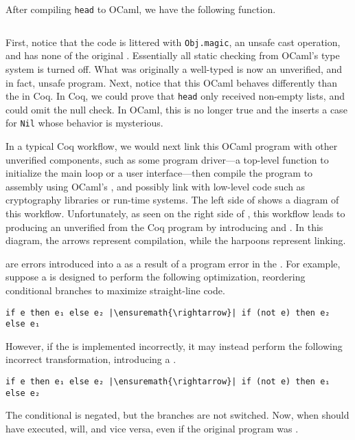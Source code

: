 After compiling \texttt{head} to OCaml, we have the following function.
\inputminted[xleftmargin=1em,firstline=16,lastline=23,firstnumber=1]{ocaml}{chapters/intro/head.ml}

\noindent First, notice that the code is littered with
\texttt{Obj.magic}, an unsafe cast operation, and has none of the
original .
Essentially all static checking from OCaml's type system is turned off.
What was originally a well-typed  is now an unverified,
and in fact, unsafe program.
Next, notice that this OCaml  behaves differently than the
 in Coq.
In Coq, we could prove that \texttt{head} only received non-empty
lists, and could omit the null check.
In OCaml, this is no longer true and the  inserts a case for
\texttt{Nil} whose behavior is mysterious.

\FigCompileDiagram
In a typical Coq workflow, we would next link this OCaml program with other
unverified components, such as some program driver---a top-level function to
initialize the main loop or a user interface---then compile the program to
assembly using OCaml's , and possibly link with low-level code
such as cryptography libraries or run-time systems.
The left side of  shows a diagram of this
workflow.
Unfortunately, as seen on the right side of
, this workflow leads to producing an
unverified  from the  Coq program by introducing
 and .
In this diagram, the arrows represent compilation, while the harpoons represent
linking.

 are
errors introduced into a  as a result of a program error in the
.
For example, suppose a  is designed to perform the following
optimization, reordering conditional branches to maximize straight-line code.
\begin{verbatim}
if e then e₁ else e₂ |\ensuremath{\rightarrow}| if (not e) then e₂ else e₁
\end{verbatim}
However, if the  is implemented incorrectly, it may instead
perform the following incorrect transformation, introducing a
.
\begin{verbatim}
if e then e₁ else e₂ |\ensuremath{\rightarrow}| if (not e) then e₁ else e₂
\end{verbatim}
The conditional is negated, but the branches are not switched.
Now, when  should have executed,  will, and vice versa, even
if the original program was .

